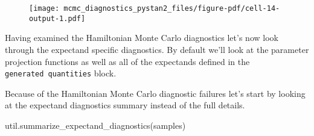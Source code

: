 \documentclass[
  letterpaper,
  DIV=11,
  numbers=noendperiod]{scrartcl}
\newenvironment{Shaded}{\begin{snugshade}}{\end{snugshade}}
\newcommand{\NormalTok}[1]{\textcolor[rgb]{0.00,0.23,0.31}{#1}}
\begin{document}
\begin{figure}[H]

{\centering \texttt{[image: mcmc\_diagnostics\_pystan2\_files/figure-pdf/cell-14-output-1.pdf]}

}

\end{figure}

Having examined the Hamiltonian Monte Carlo diagnostics let's now look
through the expectand specific diagnostics. By default we'll look at the
parameter projection functions as well as all of the expectands defined
in the \texttt{generated\ quantities} block.

Because of the Hamiltonian Monte Carlo diagnostic failures let's start
by looking at the expectand diagnostics summary instead of the full
details.

\begin{Shaded}
\begin{Highlighting}[]
\NormalTok{util.summarize\_expectand\_diagnostics(samples)}
\end{Highlighting}
\end{Shaded}
\end{document}
